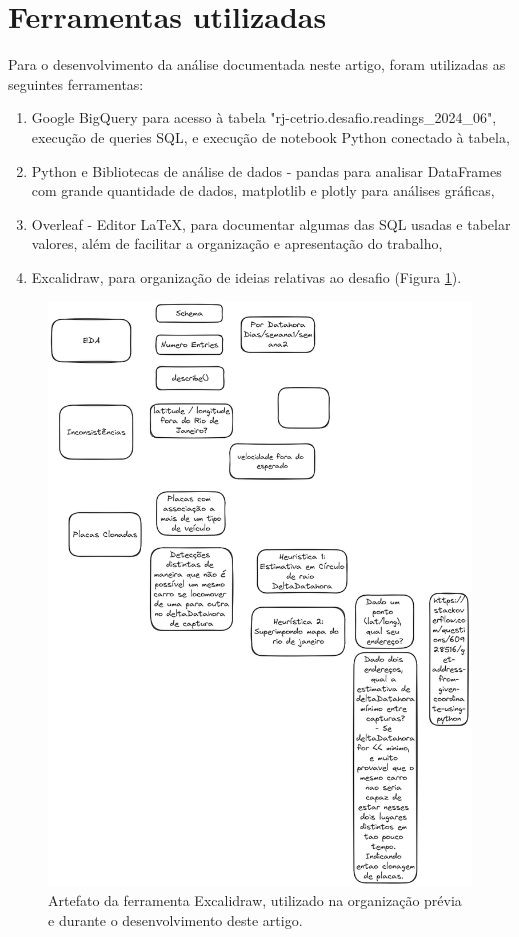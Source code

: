 \documentclass{article}
\begin{document}
\section{Ferramentas utilizadas}

Para o desenvolvimento da análise documentada neste artigo, foram utilizadas as seguintes ferramentas:

\begin{enumerate}
\item Google BigQuery para acesso à tabela "rj-cetrio.desafio.readings\_2024\_06", execução de queries SQL, e execução de notebook Python conectado à tabela,
\item Python e Bibliotecas de análise de dados - pandas para analisar DataFrames com grande quantidade de dados, matplotlib e plotly para análises gráficas,
\item Overleaf - Editor LaTeX, para documentar algumas das SQL usadas e tabelar valores, além de facilitar a organização e apresentação do trabalho,
\item Excalidraw, para organização de ideias relativas ao desafio (Figura \ref{fig:excalidraw}).
\end{enumerate}

\begin{figure}
    \centering
    \includegraphics[width=0.9\linewidth]{excalidraw.png}
    \caption{Artefato da ferramenta Excalidraw, utilizado na organização prévia e durante o desenvolvimento deste artigo.}
    \label{fig:excalidraw}
\end{figure}
\end{document}
